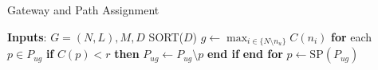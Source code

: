 \begin{algorithm}[htbp]
  \caption{Gateway and Path Assignment}
  \label{assignment}
  \begin{algorithmic}
  \small
    \STATE \textbf{Inputs}: $G = (N, L), M, D$
    \vspace{1.5mm}
    \STATE  SORT($D$)
    \vspace{0.7mm}
    \vspace{0.7mm}
    \STATE \hspace{0.4cm} $g \leftarrow \max_{i \in \{N \setminus {n_u}\}} C(n_i)$ 
    \vspace{0.7mm} 
    \STATE \hspace{0.4cm} \textbf{for} each $p \in P_{ug}$
    \vspace{0.7mm}
    \STATE \hspace{0.8cm} \textbf{if} $C(p) < r$ \textbf{then}
    \vspace{0.7mm}
    \STATE \hspace{1.2cm} $P_{ug} \leftarrow P_{ug} \setminus {p}$
    \vspace{0.7mm}
    \STATE \hspace{0.8cm} \textbf{end if}
    \vspace{0.7mm}
    \STATE \hspace{0.4cm} \textbf{end for}
    \vspace{0.7mm}
    \STATE \hspace{0.4cm} $p \leftarrow \mathrm{SP} (P_{ug})$
    \vspace{0.7mm}
    \ENDFOR
  \end{algorithmic}
\end{algorithm}

